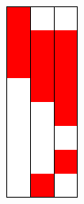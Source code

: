 \label{subsec:trainedoperation}
\begin{figure}[h]
	\centering
	\begin{subfigure}{.15\textwidth}
		\centering
		\includegraphics[width=.75\textwidth]{fullRun/0_py/input.png}

\end{subfigure}
\end{figure}
